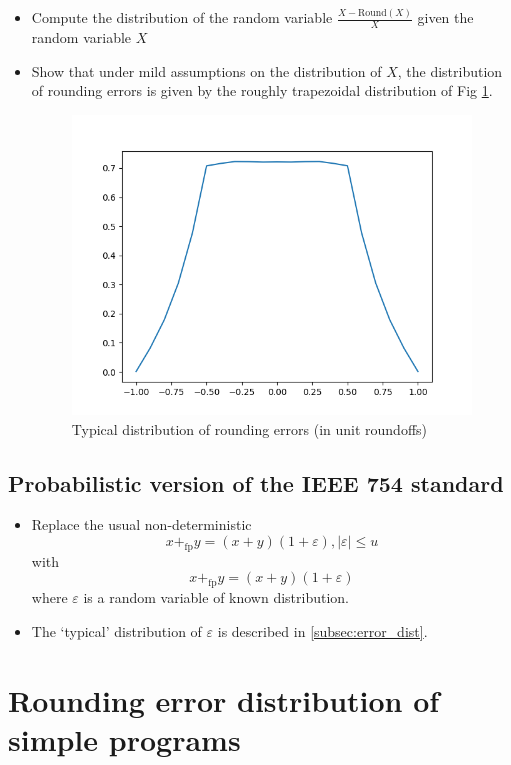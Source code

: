 \documentclass[10pt,conference]{IEEEtran}
\newcommand{\round}{\mathrm{Round}}
\newcommand{\pfp}{+_{\mathrm{fp}}}
\newcommand{\absv}[1]{\vert #1\vert}
\begin{document}
\begin{itemize}
\item Compute the distribution of the random variable $\frac{X-\round(X)}{X}$ given the random variable $X$
\item Show that under mild assumptions on the distribution of $X$, the distribution of rounding errors is given by the roughly trapezoidal distribution of Fig \ref{fig:trapeze}.
\begin{figure}[ht!]
\includegraphics[scale=0.55]{trapeze_dist}
\caption{Typical distribution of rounding errors (in unit roundoffs)}
\label{fig:trapeze}
\end{figure}
\end{itemize}

\subsection{Probabilistic version of the IEEE 754 standard}\label{subsec:prob_ieee754}

\begin{itemize}
\item Replace the usual non-deterministic 
\[
x\pfp y=(x+y)(1+\varepsilon), \absv{\varepsilon}\leq u
\]
with
\[
x\pfp y=(x+y)(1+\varepsilon)
\]
where $\varepsilon$ is a random variable of known distribution.
\item The `typical' distribution of $\varepsilon$ is described in \cref{subsec:error_dist}.
\end{itemize}

\section{Rounding error distribution of simple programs}
\end{document}
